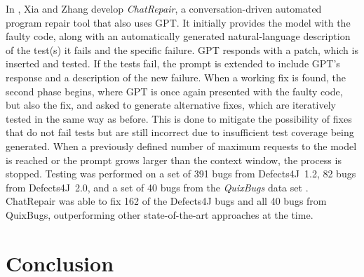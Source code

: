 \documentclass[11pt,titlepage,oneside,openany]{book}
\begin{document}
In \cite{xia_keep_2023}, Xia and Zhang develop \emph{ChatRepair}, a conversation-driven automated program repair tool that also uses GPT. It initially provides the model with the faulty code, along with an automatically generated natural-language description of the test(s) it fails and the specific failure. GPT responds with a patch, which is inserted and tested. If the tests fail, the prompt is extended to include GPT's response and a description of the new failure. When a working fix is found, the second phase begins, where GPT is once again presented with the faulty code, but also the fix, and asked to generate alternative fixes, which are iteratively tested in the same way as before. This is done to mitigate the possibility of fixes that do not fail tests but are still incorrect due to insufficient test coverage being generated. When a previously defined number of maximum requests to the model is reached or the prompt grows larger than the context window, the process is stopped. Testing was performed on a set of 391 bugs from Defects4J~1.2, 82 bugs from Defects4J~2.0, and a set of 40 bugs from the \emph{QuixBugs} data set \cite{lin_quixbugs_2017}. ChatRepair was able to fix 162 of the Defects4J bugs and all 40 bugs from QuixBugs, outperforming other state-of-the-art approaches at the time.

\chapter{Conclusion}
\end{document}
